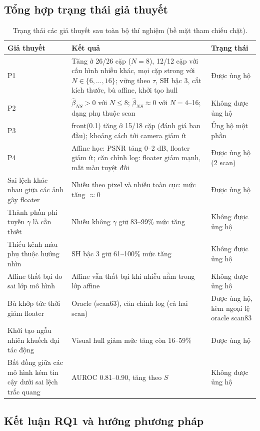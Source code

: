\documentclass[11pt,a4paper]{article}
\begin{document}
\subsection{Tổng hợp trạng thái giả thuyết}
\begin{table}[H]
\centering\small
\caption{Trạng thái các giả thuyết sau toàn bộ thí nghiệm (bề mặt tham chiếu chặt).}
\begin{tabularx}{\textwidth}{@{}p{4.2cm} Y p{3.0cm}@{}}
\toprule
Giả thuyết & Kết quả & Trạng thái \\
\midrule
P1 & Tăng ở 26/26 cặp ($N=8$), 12/12 cặp với cấu hình nhiễu khác, mọi cặp strong với $N\in\{6,\dots,16\}$; vững theo $\tau$, SH bậc 3, cắt kích thước, bù affine, khởi tạo hull & Được ủng hộ \\
P2 & $\hat\beta_{NS}>0$ với $N\le8$; $\hat\beta_{NS}\approx 0$ với $N=4$--16; dạng phụ thuộc scan & Không được ủng hộ \\
P3 & front(0.1) tăng ở 15/18 cặp (đánh giá ban đầu); khoảng cách tới camera giảm ít & Ủng hộ một phần \\
P4 & Affine học: PSNR tăng 0--2 dB, floater giảm ít; căn chỉnh log: floater giảm mạnh, mất màu tuyệt đối & Được ủng hộ (2 scan) \\
Sai lệch khác nhau giữa các ảnh gây floater & Nhiễu theo pixel và nhiễu toàn cục: mức tăng $\approx 0$ & Được ủng hộ \\
Thành phần phi tuyến $\gamma$ là cần thiết & Nhiễu không $\gamma$ giữ 83--99\% mức tăng & Không được ủng hộ \\
Thiếu kênh màu phụ thuộc hướng nhìn & SH bậc 3 giữ 61--100\% mức tăng & Không được ủng hộ \\
Affine thất bại do sai lớp mô hình & Affine vẫn thất bại khi nhiễu nằm trong lớp affine & Không được ủng hộ \\
Bù khớp tức thời giảm floater & Oracle (scan63), căn chỉnh log (cả hai scan) & Được ủng hộ, kèm ngoại lệ oracle scan83 \\
Khởi tạo ngẫu nhiên khuếch đại tác động & Visual hull giảm mức tăng còn 16--59\% & Được ủng hộ \\
Bất đồng giữa các mô hình kém tin cậy dưới sai lệch trắc quang & AUROC 0.81--0.90, tăng theo $S$ & Không được ủng hộ \\
\bottomrule
\end{tabularx}
\end{table}

\subsection{Kết luận RQ1 và hướng phương pháp}
\label{sec:conclusion}
\end{document}
